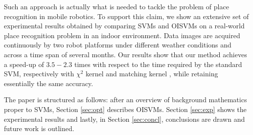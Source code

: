 Such an approach is actually what is needed to tackle the problem of
place recognition in mobile robotics. To support this claim, we show
an extensive set of experimental results obtained by comparing SVMs
and OISVMs on a real-world place recognition problem in an indoor
environment. Data images are acquired continuously by two robot
platforms under different weather conditions and across a time span of
several months. Our results show that our method achieves a speed-up
of $3.5-2.3$ times with respect to the time required by the standard SVM,
respectively with $\chi^2$ kernel and matching kernel \cite{wallraven:iccv03},
while retaining essentially the same accuracy.

The paper is structured as follows: after an overview  of background
mathematics proper to SVMs,  Section \ref{sec:opt} describes OISVMs.
Section \ref{sec:exp} shows the experimental results and
lastly, in Section \ref{sec:concl}, conclusions are drawn and future
work is outlined.
